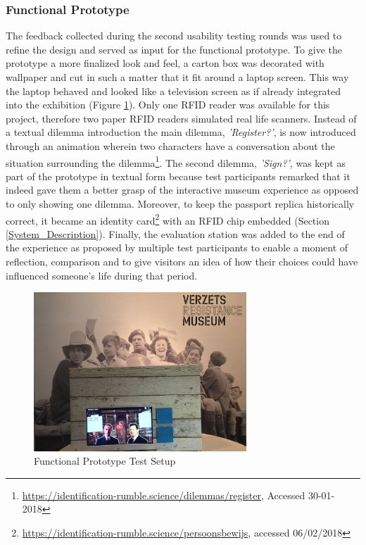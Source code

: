 \subsubsection{Functional Prototype} The feedback collected during the second usability testing rounds was used to refine the design and served as input for the functional prototype. To give the prototype a more finalized look and feel, a carton box was decorated with wallpaper and cut in such a matter that it fit around a laptop screen. This way the laptop behaved and looked like a television screen as if already integrated into the exhibition (Figure \ref{Final_setup}). Only one RFID reader was available for this project, therefore two paper RFID readers simulated real life scanners. Instead of a textual dilemma introduction the main dilemma, \textit{'Register?'}, is now introduced through an animation wherein two characters have a conversation about the situation surrounding the dilemma\footnote{\url{https://identification-rumble.science/dilemmas/register}, Accessed 30-01-2018}. The second dilemma, \textit{'Sign?'}, was kept as part of the prototype in textual form because test participants remarked that it indeed gave them a better grasp of the interactive museum experience as opposed to only showing one dilemma. Moreover, to keep the passport replica historically correct, it became an identity card\footnote{\url{https://identification-rumble.science/persoonsbewijs}, accessed 06/02/2018} with an RFID chip embedded (Section \ref{System_Description}). Finally, the evaluation station was added to the end of the experience as proposed by multiple test participants to enable a moment of reflection, comparison and to give visitors an idea of how their choices could have influenced someone's life during that period.

\begin{figure} [h]
\includegraphics[width=8cm]{assets/prototype-in-museum-far.jpg}
\caption{Functional Prototype Test Setup}
\centering
\label{Final_setup}
\end{figure}

